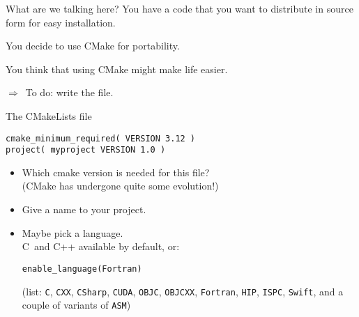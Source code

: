 

\begin{numberedframe}{What are we talking here?}
  You have a code that you want to distribute in source form
  for easy installation.

  You decide to use CMake for portability.

  You think that using CMake might make life easier.

  $\Rightarrow$~To do: write the  file.
\end{numberedframe}

\lstset{language=CMake}
\lstset{style=greencode}

\begin{numberedframe}{The CMakeLists file}
\begin{lstlisting}
cmake_minimum_required( VERSION 3.12 )
project( myproject VERSION 1.0 )
\end{lstlisting}
  \begin{itemize}
  \item Which cmake version is needed for this file?\\
    (CMake has undergone quite some evolution!)
  \item Give a name to your project.
  \item Maybe pick a language.\\
    C~and C++ available by default, or:
\begin{lstlisting}
enable_language(Fortran)
\end{lstlisting}
(list: \lstinline{C}, \lstinline{CXX}, \lstinline{CSharp}, \lstinline{CUDA}, \lstinline{OBJC},
\lstinline{OBJCXX}, \lstinline{Fortran}, \lstinline{HIP}, \lstinline{ISPC}, \lstinline{Swift},
and a couple of variants of \lstinline{ASM})
  \end{itemize}
\end{numberedframe}


